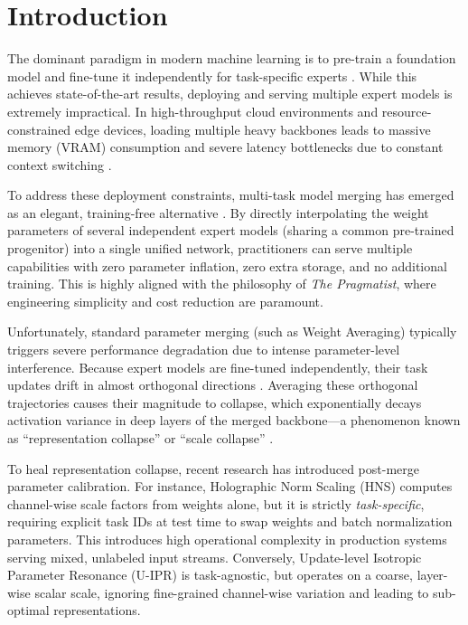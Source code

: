 \documentclass{article}
\theoremstyle{plain}
\theoremstyle{definition}
\theoremstyle{remark}
\begin{document}
\section{Introduction}
\label{sec:intro}

The dominant paradigm in modern machine learning is to pre-train a foundation model and fine-tune it independently for task-specific experts \cite{vaswani17, devlin18, deng09, he16, radford21}. While this achieves state-of-the-art results, deploying and serving multiple expert models is extremely impractical. In high-throughput cloud environments and resource-constrained edge devices, loading multiple heavy backbones leads to massive memory (VRAM) consumption and severe latency bottlenecks due to constant context switching \cite{vramswitch22}.

To address these deployment constraints, multi-task model merging has emerged as an elegant, training-free alternative \cite{wortsman22, ilharco23}. By directly interpolating the weight parameters of several independent expert models (sharing a common pre-trained progenitor) into a single unified network, practitioners can serve multiple capabilities with zero parameter inflation, zero extra storage, and no additional training. This is highly aligned with the philosophy of \textit{The Pragmatist}, where engineering simplicity and cost reduction are paramount.

Unfortunately, standard parameter merging (such as Weight Averaging) typically triggers severe performance degradation due to intense parameter-level interference. Because expert models are fine-tuned independently, their task updates drift in almost orthogonal directions \cite{choshen22}. Averaging these orthogonal trajectories causes their magnitude to collapse, which exponentially decays activation variance in deep layers of the merged backbone---a phenomenon known as ``representation collapse'' or ``scale collapse'' \cite{jordan23}.

To heal representation collapse, recent research has introduced post-merge parameter calibration. For instance, Holographic Norm Scaling (HNS) \cite{anonymous26b} computes channel-wise scale factors from weights alone, but it is strictly \textit{task-specific}, requiring explicit task IDs at test time to swap weights and batch normalization parameters. This introduces high operational complexity in production systems serving mixed, unlabeled input streams. Conversely, Update-level Isotropic Parameter Resonance (U-IPR) \cite{anonymous26c} is task-agnostic, but operates on a coarse, layer-wise scalar scale, ignoring fine-grained channel-wise variation and leading to sub-optimal representations.
\end{document}
